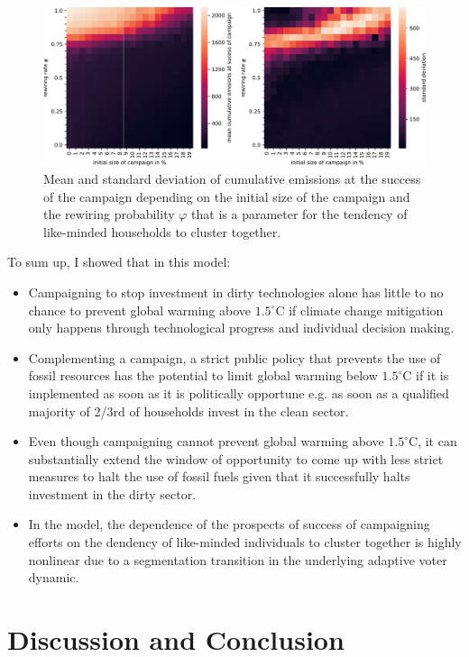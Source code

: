 \begin{figure}[t]
    \centering
    \includegraphics[width = \textwidth]{figures/campaign_vs_phi.pdf}
    \caption{Mean and standard deviation of cumulative emissions at the success of the campaign depending on the initial size of the campaign and the rewiring probability $\varphi$ that is a parameter for the tendency of like-minded households to cluster together. }
    \label{fig:campaign_phi}
\end{figure}

To sum up, I showed that in this model:
\begin{itemize}
  \item Campaigning to stop investment in dirty technologies alone has little to no chance to prevent global warming above $1.5^{\circ}$C if climate change mitigation only happens through technological progress and individual decision making.
  \item Complementing a campaign, a strict public policy that prevents the use of fossil resources has the potential to limit global warming below $1.5^{\circ}$C if it is implemented as soon as it is politically opportune e.g. as soon as a qualified majority of 2/3rd of households invest in the clean sector.
  \item Even though campaigning cannot prevent global warming above $1.5^{\circ}$C, it can substantially extend the window of opportunity to come up with less strict measures to halt the use of fossil fuels given that it successfully halts investment in the dirty sector.
  \item In the model, the dependence of the prospects of success of campaigning efforts on the dendency of like-minded individuals to cluster together is highly nonlinear due to a segmentation transition in the underlying adaptive voter dynamic.
\end{itemize}

\section{Discussion and Conclusion}
\label{sec:heuristics_conclusion}

